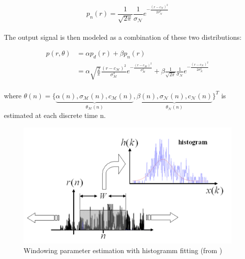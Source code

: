\documentclass[a4paper,12pt]{article}
\begin{document}
\begin{equation}
p_n(r) = \frac{1}{\sqrt{2\pi}} \frac{1}{\sigma_\mathcal{N}} e^{-\frac{(r - c_{\mathcal{N}})^2}{2\sigma_{\mathcal{N}}^2}}
\end{equation}

\paragraph{}
The output signal is then modeled as a combination of these two distributions:

\begin{equation}
\label{PiresProb}
\begin{split}
p(r, \theta) & = \alpha p_d(r) + \beta p_n(r) \\
 & = \alpha \sqrt{\frac{2}{\pi}} \frac{(r - c_{\mathcal{M}})^2}{\sigma_{\mathcal{M}}^3} e^{-\frac{(r - c_{\mathcal{M}})^2}{\sigma_{\mathcal{M}}^2}} + \beta \frac{1}{\sqrt{2\pi}} \frac{1}{\sigma_\mathcal{N}} e^{-\frac{(r - c_{\mathcal{N}})^2}{2\sigma_{\mathcal{N}}^2}}
\end{split}
\end{equation}

\paragraph{}
where $\theta(n) = \{\underbrace{\alpha(n), \sigma_\mathcal{M}(n), c_\mathcal{M}(n)}_{\theta_\mathcal{M}(n)}, \underbrace{\beta(n), \sigma_\mathcal{N}(n), c_\mathcal{N}(n)}_{\theta_\mathcal{N}(n)} \}^T$ is estimated at each discrete time n.

\begin{figure}[H]
\centering
\includegraphics[scale=0.5]{Images/PiresActivity.png}
\caption{Windowing parameter estimation with histogramm fitting (from \cite{Pires2009})}
\label{PiresActivity}
\end{figure}
\end{document}
